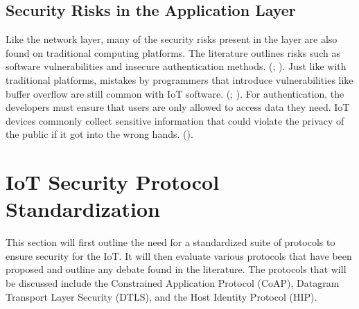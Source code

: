 \documentclass[letterpaper, 12pt]{article}
\begin{document}
\begin{flushleft}
\subsection*{Security Risks in the Application Layer}
Like the network layer, many of the security risks present in the layer are also found on traditional computing platforms. The literature outlines
risks such as software vulnerabilities and insecure authentication methods. (\cite{Zhao6746513}; \cite{Suo6188257}). Just like with traditional
platforms, mistakes by programmers that introduce vulnerabilities like buffer overflow are still common with IoT software. (\cite{Zhao6746513}; \cite{Xiaohui6643029}).  For authentication,
the developers must ensure that users are only allowed to access data they need. IoT devices commonly collect sensitive information that could
violate the privacy of the public if it got into the wrong hands. (\cite{Zhang:2015:EST:2714576.2737091}). 

\section*{IoT Security Protocol Standardization}

This section will first outline the need for a standardized suite of protocols to ensure security for the IoT. It will then evaluate various protocols
that have been proposed and outline any debate found in the literature. The protocols that will be discussed include the Constrained Application
Protocol (CoAP), Datagram Transport Layer Security (DTLS), and the Host Identity Protocol (HIP). 


\end{flushleft}
\end{document}
